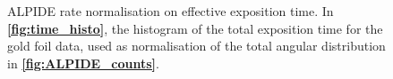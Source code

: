 \documentclass[../../main/main.tex]{subfiles}
\begin{document}
\begin{figure}[h]
    \begin{minipage}[c]{0.49\linewidth}
        \vspace{0pt}
        \centering
    \end{minipage}
    \hfill
    \begin{minipage}[c]{0.49\linewidth}
        \vspace{0pt}
        \centering
    \end{minipage}
    \label{fig:profile}
    \caption{ALPIDE rate normalisation on effective exposition time. In \textbf{\ref{fig:time_histo}}, the histogram of the total exposition time for the gold foil data, used as normalisation of the total angular distribution in \textbf{\ref{fig:ALPIDE_counts}}.}
\end{figure}
\end{document}
